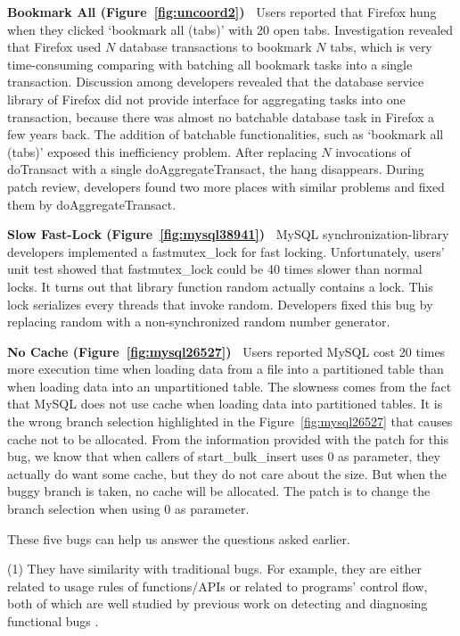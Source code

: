 {\bf Bookmark All (Figure~\ref{fig:uncoord2})\ }
Users reported that Firefox hung when they clicked `bookmark all (tabs)'
with 20 open tabs.
Investigation revealed that Firefox used $N$ database transactions to bookmark
$N$ tabs, which is very time-consuming comparing with batching all bookmark
tasks into a single transaction.
Discussion among developers revealed that the database service library of 
Firefox
did not provide interface for aggregating tasks into one transaction, because
there was almost no batchable database task in Firefox a few years back.  
The addition of batchable
functionalities, such as `bookmark all (tabs)' exposed this inefficiency
problem.
After replacing $N$ invocations of 
doTransact with a single doAggregateTransact, the hang disappears.
During patch review, developers found two more places
with similar problems and fixed them by doAggregateTransact.

{\bf Slow Fast-Lock (Figure~\ref{fig:mysql38941})\ }
MySQL synchronization-library developers implemented a fastmutex\_lock
for fast locking. Unfortunately, users' unit test showed that 
fastmutex\_lock could be 40 times slower than normal locks.
It turns out that 
library function random actually contains a lock.
This lock serializes every threads that invoke random.
Developers fixed this bug by replacing random with a 
non-synchronized random number generator.


{\bf No Cache (Figure~\ref{fig:mysql26527})\ }
Users reported MySQL cost 20 times more execution 
time when loading data from a file into a partitioned table 
than when loading data into an unpartitioned table. 
The slowness comes from the fact that MySQL does not use cache when loading data into partitioned tables. 
It is the wrong branch selection highlighted 
in the Figure~\ref{fig:mysql26527} that causes cache not to be allocated. 
From the information provided with the patch for this bug, we know that when callers 
of start\_bulk\_insert uses 
0 as parameter, they actually do want some cache, but they do not 
care about the size. But when the buggy branch is taken, no cache will be allocated. 
The patch is to change the branch selection when using 0 as parameter. 

These five bugs can help us answer the questions asked earlier.

(1) They have similarity with traditional bugs.
For example, they are either related to usage rules of functions/APIs or related to programs' control flow,
both of which are well studied by previous work on detecting and diagnosing functional 
bugs \citep{PRMiner05,livshits05dynamine,liblit05}.


